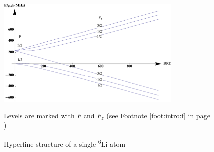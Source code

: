 \begin{figure}[htbp]
\begin{center}
\includegraphics[width=0.8\textwidth]{hyperfineLi6}
\caption{Hyperfine structure of a single \textsuperscript{6}Li atom } 
Levels are marked with $F$ and $F_{z}$ {(see Footnote \ref{foot:intro:f} in page \pageref{foot:intro:f})} %
\label{fig:intro:li6}
\end{center}
\end{figure}



